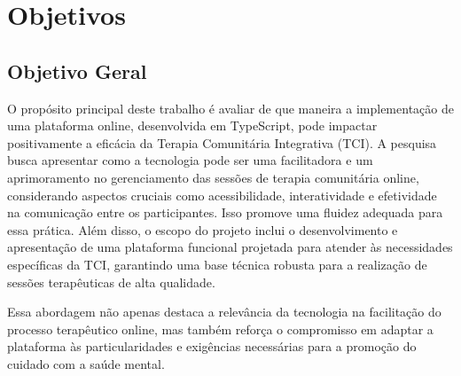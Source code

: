 \chapter*[Objetivos]{Objetivos}
\section*{Objetivo Geral}
O propósito principal deste trabalho é avaliar de que maneira a implementação de uma plataforma online, desenvolvida em TypeScript, pode impactar positivamente a eficácia da Terapia Comunitária Integrativa (TCI). A pesquisa busca apresentar como a tecnologia pode ser uma facilitadora e um aprimoramento no gerenciamento das sessões de terapia comunitária online, considerando aspectos cruciais como acessibilidade, interatividade e efetividade na comunicação entre os participantes. Isso promove uma fluidez adequada para essa prática. Além disso, o escopo do projeto inclui o desenvolvimento e apresentação de uma plataforma funcional projetada para atender às necessidades específicas da TCI, garantindo uma base técnica robusta para a realização de sessões terapêuticas de alta qualidade.

Essa abordagem não apenas destaca a relevância da tecnologia na facilitação do processo terapêutico online, mas também reforça o compromisso em adaptar a plataforma às particularidades e exigências necessárias para a promoção do cuidado com a saúde mental.

